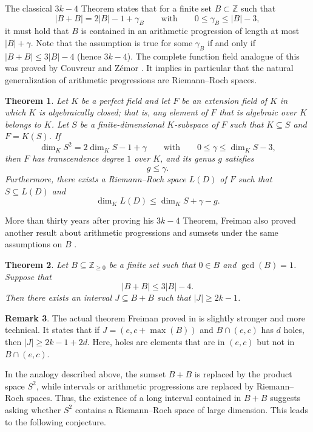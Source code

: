 \documentclass[12pt]{amsart}
\renewcommand{\leq}{\leqslant}
\renewcommand{\geq}{\geqslant}
\newcommand{\Z}{\mathbb{Z}}
\newtheorem{theorem}{Theorem}[section]
\theoremstyle{definition}
\newtheorem{remark}[theorem]{Remark}
\begin{document}
	The classical $3k-4$ Theorem states that for a finite set $B \subset \Z$ such that
	$$|B+B|=2|B|-1+\gamma_B
	\qquad\text{with}\qquad
	0\leq\gamma_B \leq |B|-3,$$
	it must hold that $B$ is contained in an arithmetic progression of length at most $|B|+\gamma$. Note that the assumption is true for some $\gamma_B$ if and only if $|B+B| \leq 3|B|-4$ (hence $3k-4$). The complete function field analogue of this was proved by Couvreur and Z\'emor \cite{couvreur2024freimanproof}. It implies in particular that the natural generalization of arithmetic progressions are Riemann--Roch spaces. 
	\begin{theorem}\label{thm:3k-4}
		Let $K$ be a perfect field and let $F$ be an extension field of $K$ in which
		$K$ is algebraically closed; that is, any element of $F$ that is algebraic over
		$K$ belongs to $K$. Let $S$ be a finite-dimensional $K$-subspace of $F$ such
		that $K \subseteq S$ and $F = K(S)$. If
		$$ \dim_K S^2 = 2\dim_K S - 1 + \gamma \qquad\text{
			with}\qquad 0 \leq \gamma \leq \dim_K S - 3,$$
		then $F$ has transcendence degree $1$ over $K$, and its genus $g$ satisfies
		$$g \leq \gamma.$$
		Furthermore, there exists a Riemann--Roch space $L(D)$ of $F$ such that
		$S \subseteq L(D)$ and
		$$\dim_K L(D) \leq \dim_K S + \gamma - g. $$
	\end{theorem}

	More than thirty years after proving his $3k-4$ Theorem, Freiman also proved another result about arithmetic progressions and sumsets under the same assumptions on $B$ \cite{Freiman2009intcase}. 
	
	\begin{theorem}\label{thm:frei}
		Let $B \subseteq \Z_{\geq 0}$ be a finite set such that $0 \in B$ and $\gcd(B) = 1$. Suppose that 
		$$|B + B| \leq 3|B| - 4.$$ 
		Then there exists an interval $J \subseteq B+B$ such that $|J| \geq 2k-1$. 
	\end{theorem}
	\begin{remark}
		The actual theorem Freiman proved in \cite{Freiman2009intcase} is slightly stronger and more technical. It states that if $J = (e, c+\max(B))$ and $B \cap (e, c)$ has $d$ holes, then $|J| \geq 2k - 1 + 2d$. Here, holes are elements that are in $(e, c)$ but not in $B \cap (e, c)$. 
	\end{remark}
	
	In the analogy described above, the sumset $B+B$ is replaced by the product space $S^2$, while intervals or arithmetic progressions are replaced by Riemann--Roch spaces. Thus, the existence of a long interval contained in $B+B$ suggests asking whether $S^2$ contains a Riemann--Roch space of large dimension. This leads to the following conjecture.
	
\end{document}
